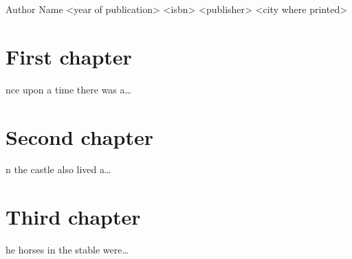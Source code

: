 \documentclass{tsnovel}
\begin{document}
        {Author Name}
        {<year of publication>}
        {<isbn>}
        {<publisher>}
        {<city where printed>}

\chapter{First chapter}

nce upon a time there was a\ldots
\blindtext

\Blindtext[3][3]

\chapter{Second chapter}

n the castle also lived a\ldots
\blindtext

\Blindtext[3][3]

\chapter{Third chapter}

he horses in the stable were\ldots
\blindtext

\Blindtext[3][3]
\end{document}
